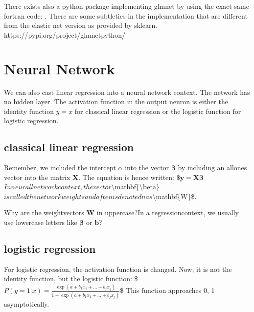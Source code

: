 \documentclass[letterpaper,10pt,english]{jupyterBook}
\begin{document}
\sphinxAtStartPar
There exists also a python package implementing glmnet by using the exact same fortran code: .
There are some subtleties in the implementation that are different from the elastic net version as provided by sklearn.
https://pypi.org/project/glmnet\sphinxhyphen{}python/


\chapter{Neural Network}
\label{\detokenize{Regression_Techniques:neural-network}}
\sphinxAtStartPar
We can also cast linear regression into a neural network context. The network has no hidden layer. The activation function in the output neuron is either the identity function \(y=x\) for classical linear regression or the logistic function for logistic regression.


\section{classical linear regression}
\label{\detokenize{Regression_Techniques:classical-linear-regression}}


\sphinxAtStartPar
Remember, we included the intercept \(\alpha\) into the vector \(\mathbf{\beta}\) by including an all\sphinxhyphen{}ones vector into the matrix \(\mathbf{X}\). The equation is hence written:
\$\(\mathbf{y} = \mathbf{X} \mathbf{\beta}\)\(
In neurall network context, the vector \)\textbackslash{}mathbf\{\textbackslash{}beta\}\( is called the network weights and often is denotedn as \)\textbackslash{}mathbf\{W\}\$.

\sphinxAtStartPar
Why are the weight\sphinxhyphen{}vectors \(\mathbf{W}\) in upper\sphinxhyphen{}case?In a regression\sphinxhyphen{}context, we usually use lower\sphinxhyphen{}case letters like \(\mathbf{\beta}\) or \(\mathbf{b}\)?


\section{logistic regression}
\label{\detokenize{Regression_Techniques:logistic-regression}}


\sphinxAtStartPar
For logistic regression, the activation function is changed. Now, it is not the identity function, but the logistic function:
\$\(P(y=1 |x) = \frac{\exp(a + b_{1}x_1 + \ldots + b_jx_j)}{1 + \exp(a + b_{1}x_1 + \ldots + b_jx_j)}\)\$
This function approaches 0, 1 asymptotically.
\end{document}
